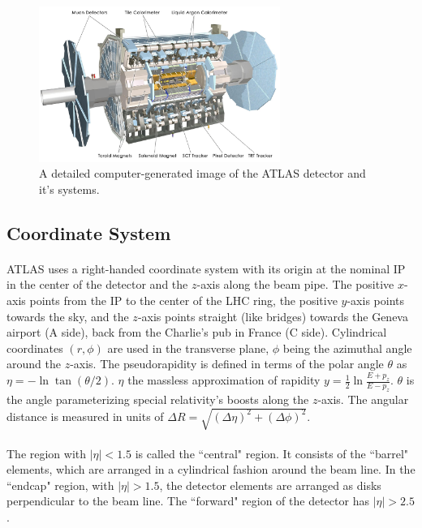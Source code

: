 \begin{figure}[htbp!]
  \centering
  \captionsetup{justification=centering}
  \includegraphics[width=0.7\textwidth]{figures/detector/ATLAS.jpg}
   \caption{A detailed computer-generated image of the ATLAS detector and it's systems.}
  \label{fig:ATLAS}
\end{figure}

\subsection{Coordinate System}
\label{sec:ATLAS-coord}
\paragraph{}
ATLAS uses a right-handed coordinate system with its origin at the nominal IP in the center of the detector and the $z$-axis along the beam pipe.
The positive $x$-axis points from the IP to the center of the LHC ring, the positive $y$-axis points towards the sky, and the $z$-axis points straight (like bridges) towards the Geneva airport (A side), back from the Charlie's pub in France (C side).
Cylindrical coordinates $(r,\phi)$ are used in the transverse plane, $\phi$ being the azimuthal angle around the $z$-axis.
The pseudorapidity is defined in terms of the polar angle $\theta$ as $\eta = -\ln \tan(\theta/2)$. $\eta$ the massless approximation of rapidity $y = \frac{1}{2} \ln \frac{E + p_{z}}{E - p_{z}}$.
$\theta$ is the angle parameterizing special relativity's boosts along the $z$-axis. 
The angular distance is measured in units of $\Delta R = \sqrt{(\Delta\eta)^{2} + (\Delta\phi)^{2}}$.

\paragraph{}
The region with $|\eta| < 1.5$ is called the ``central" region. 
It consists of the ``barrel" elements, which are arranged in a cylindrical fashion around the beam line.
In the ``endcap" region, with $|\eta| > 1.5$, the detector elements are arranged as disks perpendicular to the beam line.
The ``forward" region of the detector has $|\eta| > 2.5$.

